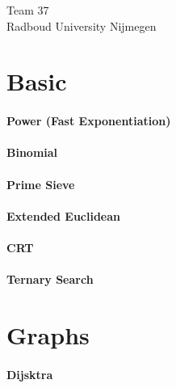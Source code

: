 \documentclass[a4paper]{article}
\begin{document}
\null\vfill
\begin{center}
{\huge Team 37}\\
\vspace{10cm}
{\large Radboud University Nijmegen}
\end{center}
\vfill
\thispagestyle{empty} %
\newpage

\clearpage
\setcounter{page}{1}

\tableofcontents
\newpage

\section{Basic} 
\paragraph{Power (Fast Exponentiation)} \hfill

\paragraph{Binomial} \hfill

\paragraph{Prime Sieve} \hfill



\newpage
\paragraph{Extended Euclidean} \hfill

\paragraph{CRT} \hfill

\paragraph{Ternary Search}\hfill


\newpage
\section{Graphs}
\paragraph{Dijsktra} \hfill

\end{document}
